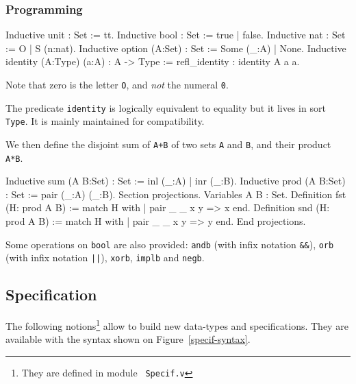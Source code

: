 \subsubsection[Programming]{Programming\label{Programming}
\label{libnats}
}

\begin{coq_example*}
Inductive unit : Set := tt.
Inductive bool : Set := true | false.
Inductive nat : Set := O | S (n:nat).
Inductive option (A:Set) : Set := Some (_:A) | None.
Inductive identity (A:Type) (a:A) : A -> Type :=
    refl_identity : identity A a a.
\end{coq_example*}

Note that zero is the letter \verb:O:, and {\sl not} the numeral
\verb:0:.

The predicate {\tt identity} is logically 
equivalent to equality but it lives in sort {\tt
  Type}. It is mainly maintained for compatibility.

We then define the disjoint sum of \verb:A+B: of two sets \verb:A: and
\verb:B:, and their product \verb:A*B:.
\ttindex{+}
\ttindex{*}

\begin{coq_example*}
Inductive sum (A B:Set) : Set := inl (_:A) | inr (_:B).
Inductive prod (A B:Set) : Set := pair (_:A) (_:B).
Section projections.
Variables A B : Set.
Definition fst (H: prod A B) := match H with
                                | pair _ _ x y => x
                                end.
Definition snd (H: prod A B) := match H with
                                | pair _ _ x y => y
                                end.
End projections.
\end{coq_example*}

Some operations on {\tt bool} are also provided: {\tt andb} (with
infix notation {\tt \&\&}), {\tt orb} (with
infix notation {\tt ||}), {\tt xorb}, {\tt implb} and {\tt negb}.

\subsection{Specification}

The following notions\footnote{They are defined in module {\tt
Specif.v}} allow to build new data-types and specifications. 
They are available with the syntax shown on
Figure~\ref{specif-syntax}.

